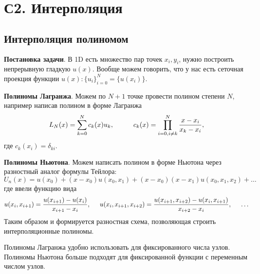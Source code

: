 \section{С2. Интерполяция}

\subsection*{Интерполяция полиномом}


\textbf{Постановка задачи}. В 1D есть множество пар точек ${x_i, y_i}$, нужно построить непрерывную гладкую $u(x)$. 
Вообще можем говорить, что у нас есть сеточная проекция функции $u(x) \colon  \{u_i\}_{i=0}^{N} = \{u(x_i)\}$.  


\textbf{Полиномы Лагранжа}. 
Можем по $N+1$ точке провести полином степени $N$, например написав полином в форме Лагранжа
\begin{equation}
	L_N (x) = \sum_{k=0}^{N} c_k (x) u_k,
	\hspace{10 mm} 
	c_k (x) = \prod_{i=0, i\neq k}^{N} \frac{x-x_i}{x_k-x_i},
\end{equation}
где $c_k (x_i) = \delta_{ki}$.

\textbf{Полиномы Ньютона}. 
Можем написать полином в форме Ньютона через разностный аналог формулы Тейлора:
\begin{equation}
	U_n (x) = u (x_0) + (x-x_0) u(x_0, x_1) + (x-x_0) (x-x_1) u(x_0,x_1, x_2) + \ldots
\end{equation}
где ввели функцию вида
\begin{equation}
	u(x_i, x_{i+1}) = \frac{u(x_{i+1}) - u(x_i)}{x_{i+1}-x_i},
	\hspace{5 mm} 
	u(x_i, x_{i+1}, x_{i+2}) = \frac{u(x_{i+1}, x_{i+2}) - u(x_i, x_{i+1})}{x_{i+2}-x_i}, \hspace{5 mm} \ldots
\end{equation}
Таким образом и формируется разностная схема, позволяющая строить интерполяционные полиномы. 

Полиномы Лагранжа удобно использовать для фиксированного числа узлов. Полиномы Ньютона больше подходят для фиксированной функции с переменным числом узлов.

